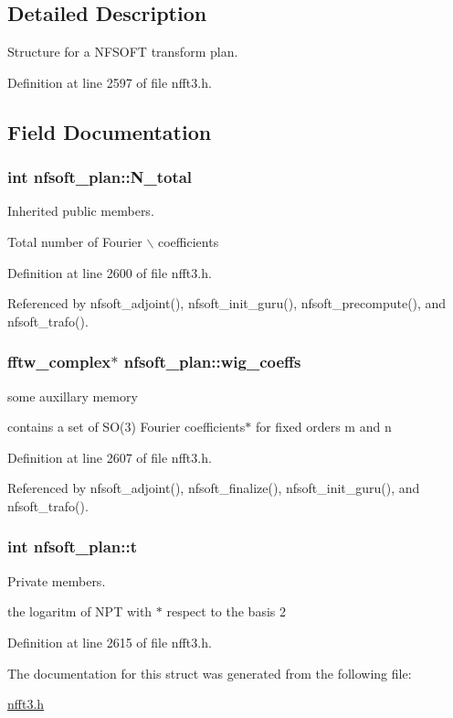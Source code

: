 \subsection{Detailed Description}
Structure for a NFSOFT transform plan. 

Definition at line 2597 of file nfft3.h.

\subsection{Field Documentation}
\hypertarget{structnfsoft__plan_2f54052e48b3c46b98898e768f0f9350}{
\subsubsection{\setlength{\rightskip}{0pt plus 5cm}int {\bf nfsoft\_\-plan::N\_\-total}}}
\label{structnfsoft__plan_2f54052e48b3c46b98898e768f0f9350}


Inherited public members. 

Total number of Fourier $\backslash$ coefficients 

Definition at line 2600 of file nfft3.h.

Referenced by nfsoft\_\-adjoint(), nfsoft\_\-init\_\-guru(), nfsoft\_\-precompute(), and nfsoft\_\-trafo().\hypertarget{structnfsoft__plan_10aef5036be8e0cf822db94e3b254543}{
\subsubsection{\setlength{\rightskip}{0pt plus 5cm}fftw\_\-complex$\ast$ {\bf nfsoft\_\-plan::wig\_\-coeffs}}}
\label{structnfsoft__plan_10aef5036be8e0cf822db94e3b254543}


some auxillary memory 

contains a set of SO(3) Fourier coefficients$\ast$ for fixed orders m and n 

Definition at line 2607 of file nfft3.h.

Referenced by nfsoft\_\-adjoint(), nfsoft\_\-finalize(), nfsoft\_\-init\_\-guru(), and nfsoft\_\-trafo().\hypertarget{structnfsoft__plan_e716c2f66be287f40e49df0e09f6b777}{
\subsubsection{\setlength{\rightskip}{0pt plus 5cm}int {\bf nfsoft\_\-plan::t}}}
\label{structnfsoft__plan_e716c2f66be287f40e49df0e09f6b777}


Private members. 

the logaritm of NPT with $\ast$ respect to the basis 2 

Definition at line 2615 of file nfft3.h.

The documentation for this struct was generated from the following file:\begin{CompactItemize}
\item 
\hyperlink{nfft3_8h}{nfft3.h}\end{CompactItemize}
